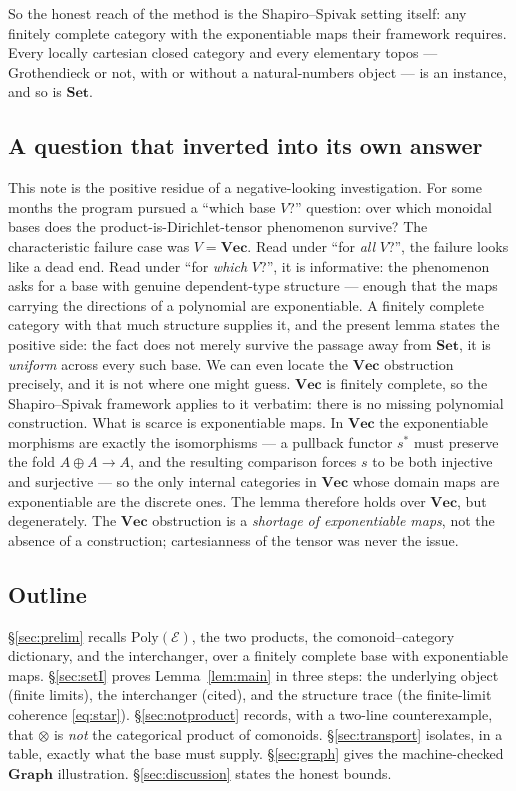 \documentclass[11pt]{amsart}
\theoremstyle{plain}
\theoremstyle{definition}
\theoremstyle{remark}
\newcommand{\Set}{\mathbf{Set}}
\newcommand{\Graph}{\mathbf{Graph}}
\newcommand{\Poly}{\mathrm{Poly}}
\newcommand{\Ee}{\mathcal{E}}
\begin{document}
So the honest reach of the method is the Shapiro--Spivak setting itself: any finitely complete
category with the exponentiable maps their framework requires. Every locally cartesian closed
category and every elementary topos --- Grothendieck or not, with or without a natural-numbers
object --- is an instance, and so is $\Set$.

\subsection*{A question that inverted into its own answer}

This note is the positive residue of a negative-looking investigation. For some months the program
pursued a ``which base $V$?'' question: over which monoidal bases does the product-is-Dirichlet-tensor
phenomenon survive? The characteristic failure case was $V=\mathbf{Vec}$. Read under ``for \emph{all}
$V$?'', the failure looks like a dead end. Read under ``for \emph{which} $V$?'', it is informative:
the phenomenon asks for a base with genuine dependent-type structure --- enough that the maps carrying
the directions of a polynomial are exponentiable. A finitely complete category with that much
structure supplies it, and the present lemma states the positive side: the fact does not merely
survive the passage away from $\Set$, it is \emph{uniform} across every such base. We can even locate
the $\mathbf{Vec}$ obstruction precisely, and it is not where one might guess. $\mathbf{Vec}$ is
finitely complete, so the Shapiro--Spivak framework applies to it verbatim: there is no missing
polynomial construction. What is scarce is exponentiable maps. In $\mathbf{Vec}$ the exponentiable
morphisms are exactly the isomorphisms --- a pullback functor $s^\ast$ must preserve the fold
$A\oplus A\to A$, and the resulting comparison forces $s$ to be both injective and surjective --- so
the only internal categories in $\mathbf{Vec}$ whose domain maps are exponentiable are the discrete
ones. The lemma therefore holds over $\mathbf{Vec}$, but degenerately. The $\mathbf{Vec}$ obstruction
is a \emph{shortage of exponentiable maps}, not the absence of a construction; cartesianness of the
tensor was never the issue.

\subsection*{Outline} \S\ref{sec:prelim} recalls $\Poly(\Ee)$, the two products, the
comonoid--category dictionary, and the interchanger, over a finitely complete base with exponentiable
maps. \S\ref{sec:setI} proves Lemma~\ref{lem:main} in three steps: the underlying object (finite
limits), the interchanger (cited), and the structure trace (the finite-limit coherence
\eqref{eq:star}). \S\ref{sec:notproduct} records, with a two-line counterexample, that $\otimes$ is
\emph{not} the categorical product of comonoids. \S\ref{sec:transport} isolates, in a table, exactly
what the base must supply. \S\ref{sec:graph} gives the machine-checked $\Graph$ illustration.
\S\ref{sec:discussion} states the honest bounds.
\end{document}
